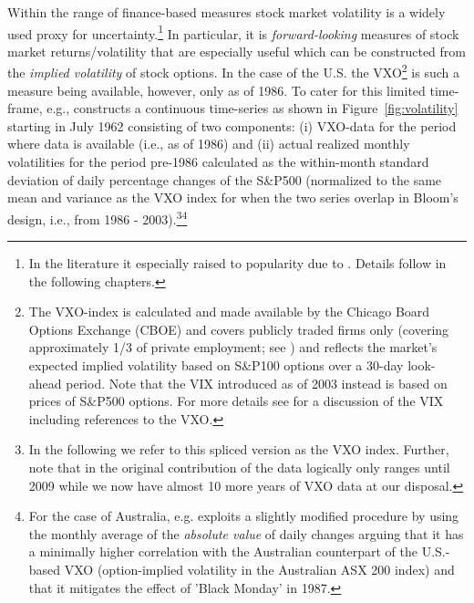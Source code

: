 \documentclass[a4paper,11pt,listof=nochaptergap,oneside,pointednumbers,bibtotoc,bigheadings,liststotoc]{scrbook}
\theoremstyle{mysatz}
\theoremstyle{mydefinition}
\theoremstyle{mybemerkung}
\begin{document}
Within the range of finance-based measures stock market volatility is a widely used proxy for uncertainty.\footnote{In the literature it especially raised to popularity due to \citet{bloom:09}. Details follow in the following chapters.} In particular, it is \textit{forward-looking} measures of stock market returns/volatility that are especially useful which can be constructed from the \textit{implied volatility} of stock options. In the case of the U.S. the VXO\footnote{The VXO-index is calculated and made available by the Chicago Board Options Exchange (CBOE) and covers publicly traded firms only (covering approximately 1/3 of private employment; see \citealp{davisetal:06}) and reflects the market's expected implied volatility based on S\&P100 options over a 30-day look-ahead period. Note that the VIX introduced as of 2003 instead is based on prices of S\&P500 options. For more details see \citet{cboe:09} for a discussion of the VIX including references to the VXO.} is such a measure being available, however, only as of 1986. To cater for this limited time-frame, e.g., \citet{bloom:09} constructs a continuous time-series as shown in Figure~\ref{fig:volatility} starting in July 1962 consisting of two components: (i) VXO-data for the period where data is available (i.e., as of 1986) and (ii) actual realized monthly volatilities for the period pre-1986 calculated as the within-month standard deviation of daily percentage changes of the S\&P500 (normalized to the same mean and variance as the VXO index for when the two series overlap in Bloom's design, i.e., from 1986 - 2003).\footnote{In the following we refer to this spliced version as the VXO index. Further, note that in the original contribution of \citet{bloom:09} the data logically only ranges until 2009 while we now have almost 10 more years of VXO data at our disposal.}\footnote{For the case of Australia, e.g. \citet{moore:17} exploits a slightly modified procedure by using the monthly average of the \textit{absolute value} of daily changes arguing that it has a minimally higher correlation with the Australian counterpart of the U.S.-based VXO (option-implied volatility in the Australian ASX 200 index) and that it mitigates the effect of 'Black Monday' in 1987.}
\end{document}

